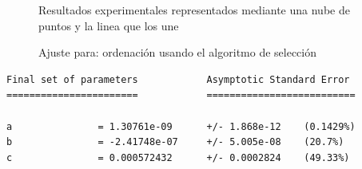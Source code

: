 
\begin{figure}[H]%
    \centering
    \caption{Resultados experimentales representados mediante una nube de puntos y la linea que los une}%
    \centering
    \caption{Ajuste para: ordenación usando el algoritmo de selección}%
\end{figure}

\begin{verbatim}
Final set of parameters            Asymptotic Standard Error
=======================            ==========================

a               = 1.30761e-09      +/- 1.868e-12    (0.1429%)
b               = -2.41748e-07     +/- 5.005e-08    (20.7%)
c               = 0.000572432      +/- 0.0002824    (49.33%)


\end{verbatim}

